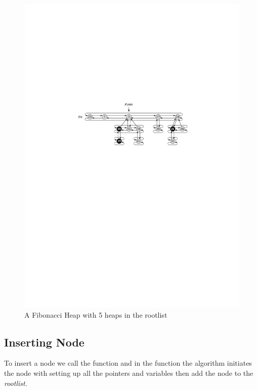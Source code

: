 \begin{figure}[h!]
	\centering
	\includegraphics{images/Fibheap1.pdf}
	\caption{A Fibonacci Heap with 5 heaps in the rootlist}
\end{figure}
\subsection{Inserting Node}
To insert a node we call the  function and in the function the algorithm initiates the node with setting up all the pointers and variables then add the node to the \emph{rootlist}.\parinf

